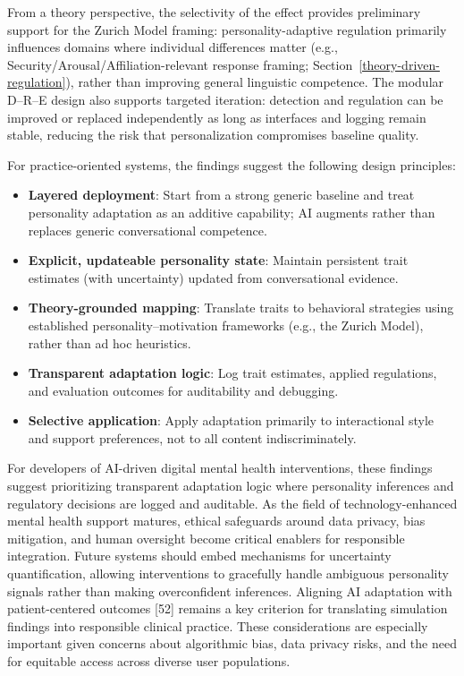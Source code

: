 \documentclass[apajournal,article,submit,moreauthors]{Definitions/mdpi}
\providecommand\tightlist{}
\begin{document}
From a theory perspective, the selectivity of the effect provides preliminary support for the Zurich Model framing: personality-adaptive regulation primarily influences domains where individual differences matter (e.g., Security/Arousal/Affiliation-relevant response framing; Section~\ref{theory-driven-regulation}), rather than improving general linguistic competence. The modular D--R--E design also supports targeted iteration: detection and regulation can be improved or replaced independently as long as interfaces and logging remain stable, reducing the risk that personalization compromises baseline quality.

For practice-oriented systems, the findings suggest the following design principles:

\begin{itemize}
\tightlist
\item
  \textbf{Layered deployment}: Start from a strong generic baseline and treat personality adaptation as an additive capability; AI augments rather than replaces generic conversational competence.
\item
  \textbf{Explicit, updateable personality state}: Maintain persistent trait estimates (with uncertainty) updated from conversational evidence.
\item
  \textbf{Theory-grounded mapping}: Translate traits to behavioral strategies using established personality--motivation frameworks (e.g., the Zurich Model), rather than ad hoc heuristics.
\item
  \textbf{Transparent adaptation logic}: Log trait estimates, applied regulations, and evaluation outcomes for auditability and debugging.
\item
  \textbf{Selective application}: Apply adaptation primarily to interactional style and support preferences, not to all content indiscriminately.
\end{itemize}

For developers of AI-driven digital mental health interventions, these findings suggest prioritizing transparent adaptation logic where personality inferences and regulatory decisions are logged and auditable. As the field of technology-enhanced mental health support matures, ethical safeguards around data privacy, bias mitigation, and human oversight become critical enablers for responsible integration. Future systems should embed mechanisms for uncertainty quantification, allowing interventions to gracefully handle ambiguous personality signals rather than making overconfident inferences. Aligning AI adaptation with patient-centered outcomes {[}52{]} remains a key criterion for translating simulation findings into responsible clinical practice. These considerations are especially important given concerns about algorithmic bias, data privacy risks, and the need for equitable access across diverse user populations.
\end{document}
